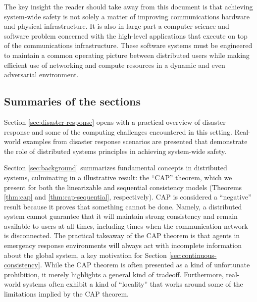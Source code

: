 \documentclass[]             %
{NASA}                       %
\theoremstyle{definition}
\begin{document}
The key insight the reader should take away from this document is that
achieving system-wide safety is not solely a matter of improving
communications hardware and physical infrastructure. It is also in
large part a computer science and software problem concerned with the
high-level applications that execute on top of the communications
infrastructure. These software systems must be engineered to maintain
a common operating picture between distributed users while making
efficient use of networking and compute resources in a dynamic and
even adversarial environment.

\subsection{Summaries of the sections}
\label{ssec:summaries-of-the-sections}

Section \ref{sec:disaster-response} opens with a practical overview of
disaster response and some of the computing challenges encountered in
this setting. Real-world examples from disaster response scenarios are
presented that demonstrate the role of distributed systems principles
in achieving system-wide safety.

Section \ref{sec:background} summarizes fundamental concepts in
distributed systems, culminating in a illustrative result: the ``CAP''
theorem, which we present for both the linearizable and sequential
consistency models (Theorems \ref{thm:cap} and
\ref{thm:cap-sequential}, respectively). CAP is considered a
``negative'' result because it proves that something cannot be
done. Namely, a distributed system cannot guarantee that it will
maintain strong consistency and remain available to users at all
times, including times when the communication network is disconnected. The practical takeaway of the CAP
theorem is that agents in emergency response environments will always
act with incomplete information about the global system, a key
motivation for Section \ref{sec:continuous-consistency}. While the CAP
theorem is often presented as a kind of unfortunate prohibition, it
merely highlights a general kind of tradeoff. Furthermore, real-world
systems often exhibit a kind of ``locality'' that works around some of
the limitations implied by the CAP theorem.

\end{document}
